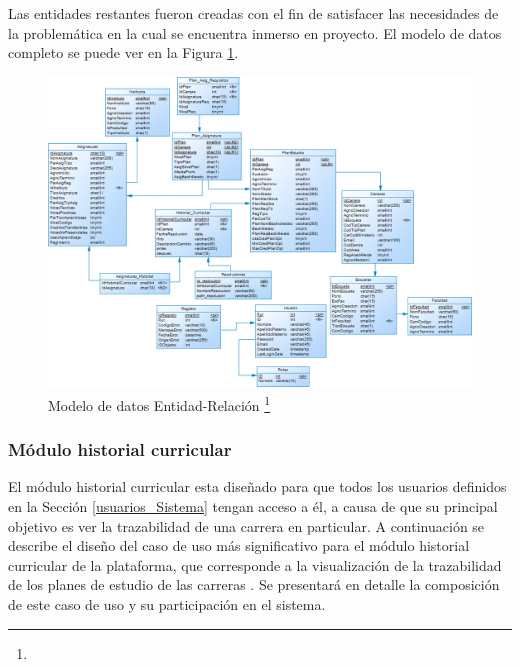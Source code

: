 	Las entidades restantes fueron creadas con el fin de satisfacer las necesidades de la problemática en la cual se encuentra inmerso en proyecto. El modelo de datos completo se puede ver en la Figura \ref{Modelo_E_R}.
	\\
	
	\begin{figure}[H]
		\centering
		\includegraphics[width=1\textwidth]{images/Capitulo_3/Modelo_E_R.png}
		\caption[Modelo de datos Entidad-Relación]{Modelo de datos Entidad-Relación \footnote{}}
		\label{Modelo_E_R}
	\end{figure}
	
	
	
	
	
	
	\subsubsection{Módulo historial curricular}
	
	El módulo historial curricular esta diseñado para que todos los usuarios definidos en la Sección \ref{usuarios_Sistema} tengan acceso a él, a causa de que su principal objetivo es ver la trazabilidad de una carrera en particular.
	A continuación se describe el diseño del caso de uso más significativo para el módulo  historial curricular de la plataforma, que corresponde a la visualización de la trazabilidad de los planes de estudio de las carreras . Se presentará en detalle la composición de este caso de uso y su participación en el sistema.
		
